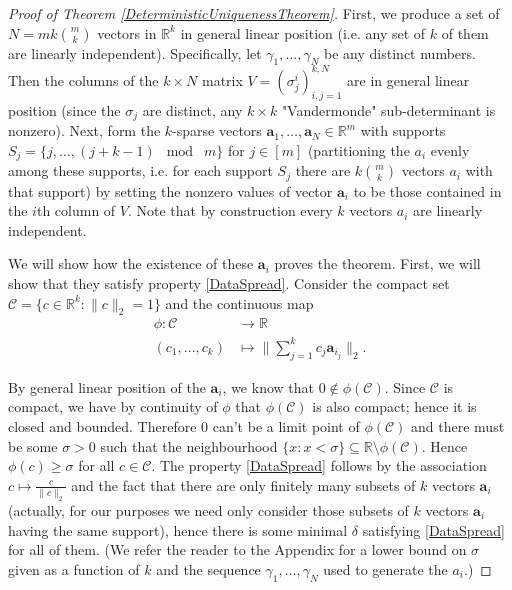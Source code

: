 \documentclass[journal, onecolumn]{IEEEtran}
\begin{document}
\begin{proof}[Proof of Theorem \ref{DeterministicUniquenessTheorem}]
First, we produce a set of $N = mk{m \choose k}$ vectors in $\mathbb{R}^k$ in general linear position (i.e. any set of $k$ of them are linearly independent). Specifically, let $\gamma_1, ..., \gamma_N$ be any distinct numbers. Then the columns of the $k \times N$ matrix $V = (\sigma^i_j)^{k,N}_{i,j=1}$ are in general linear position (since the $\sigma_j$ are distinct, any $k \times k$ "Vandermonde" sub-determinant is nonzero). Next, form the $k$-sparse vectors $\mathbf{a}_1, \ldots, \mathbf{a}_N \in \mathbb{R}^m$ with supports $S_j = \{j, \ldots, (j + k-1)\;\bmod\; m \}$ for $j \in [m]$ (partitioning the $a_i$ evenly among these supports, i.e. for each support $S_j$ there are $k{m \choose k}$ vectors $a_i$ with that support) by setting the nonzero values of vector $\mathbf{a}_i$ to be those contained in the $i$th column of $V$. Note that by construction every $k$ vectors $a_i$ are linearly independent. 

We will show how the existence of these $\mathbf{a}_i$ proves the theorem. First, we will show that they satisfy property \eqref{DataSpread}. Consider the compact set $\mathcal{C} = \{c \in \mathbb{R}^k: \|c\|_2 = 1\}$ and the continuous map
\begin{align*}
\phi: \mathcal{C} &\to \mathbb{R} \\
(c_1, ..., c_k) &\mapsto \|\sum_{j = 1}^k c_j \mathbf{a}_{i_j}\|_2.
\end{align*}

By general linear position of the $\mathbf{a}_i$, we know that $0 \notin \phi(\mathcal{C})$. Since $\mathcal{C}$ is compact, we have by continuity of $\phi$ that $\phi(\mathcal{C})$ is also compact; hence it is closed and bounded. Therefore $0$ can't be a limit point of $\phi(\mathcal{C})$ and there must be some $\sigma > 0$ such that the neighbourhood $\{x: x < \sigma\} \subseteq \mathbb{R} \setminus \phi(\mathcal{C})$. Hence $\phi(c) \geq \sigma$ for all $c \in \mathcal{C}$. The property \eqref{DataSpread} follows by the association $c \mapsto \frac{c}{\|c\|_2}$ and the fact that there are only finitely many subsets of $k$ vectors $\mathbf{a}_i$ (actually, for our purposes we need only consider those subsets of $k$ vectors $\mathbf{a}_i$ having the same support), hence there is some minimal $\delta$ satisfying \eqref{DataSpread} for all of them. (We refer the reader to the Appendix for a lower bound on $\sigma$ given as a function of $k$ and the sequence $\gamma_1, \ldots, \gamma_N$ used to generate the $a_i$.)


\end{proof}
\end{document}
